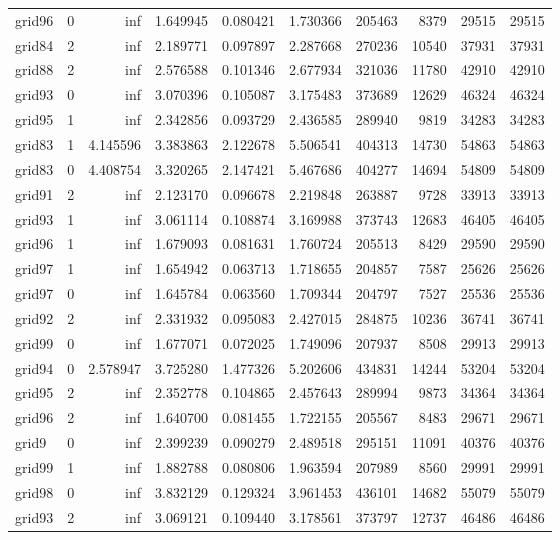 \begin{longtable}{|l|r|r|r|r|r|r|r|r|r|}
grid96 & 0 & inf & 1.649945 & 0.080421 & 1.730366 & 205463 & 8379 & 29515 & 29515 \\
grid84 & 2 & inf & 2.189771 & 0.097897 & 2.287668 & 270236 & 10540 & 37931 & 37931 \\
grid88 & 2 & inf & 2.576588 & 0.101346 & 2.677934 & 321036 & 11780 & 42910 & 42910 \\
grid93 & 0 & inf & 3.070396 & 0.105087 & 3.175483 & 373689 & 12629 & 46324 & 46324 \\
grid95 & 1 & inf & 2.342856 & 0.093729 & 2.436585 & 289940 & 9819 & 34283 & 34283 \\
grid83 & 1 & 4.145596 & 3.383863 & 2.122678 & 5.506541 & 404313 & 14730 & 54863 & 54863 \\
grid83 & 0 & 4.408754 & 3.320265 & 2.147421 & 5.467686 & 404277 & 14694 & 54809 & 54809 \\
grid91 & 2 & inf & 2.123170 & 0.096678 & 2.219848 & 263887 & 9728 & 33913 & 33913 \\
grid93 & 1 & inf & 3.061114 & 0.108874 & 3.169988 & 373743 & 12683 & 46405 & 46405 \\
grid96 & 1 & inf & 1.679093 & 0.081631 & 1.760724 & 205513 & 8429 & 29590 & 29590 \\
grid97 & 1 & inf & 1.654942 & 0.063713 & 1.718655 & 204857 & 7587 & 25626 & 25626 \\
grid97 & 0 & inf & 1.645784 & 0.063560 & 1.709344 & 204797 & 7527 & 25536 & 25536 \\
grid92 & 2 & inf & 2.331932 & 0.095083 & 2.427015 & 284875 & 10236 & 36741 & 36741 \\
grid99 & 0 & inf & 1.677071 & 0.072025 & 1.749096 & 207937 & 8508 & 29913 & 29913 \\
grid94 & 0 & 2.578947 & 3.725280 & 1.477326 & 5.202606 & 434831 & 14244 & 53204 & 53204 \\
grid95 & 2 & inf & 2.352778 & 0.104865 & 2.457643 & 289994 & 9873 & 34364 & 34364 \\
grid96 & 2 & inf & 1.640700 & 0.081455 & 1.722155 & 205567 & 8483 & 29671 & 29671 \\
grid9 & 0 & inf & 2.399239 & 0.090279 & 2.489518 & 295151 & 11091 & 40376 & 40376 \\
grid99 & 1 & inf & 1.882788 & 0.080806 & 1.963594 & 207989 & 8560 & 29991 & 29991 \\
grid98 & 0 & inf & 3.832129 & 0.129324 & 3.961453 & 436101 & 14682 & 55079 & 55079 \\
grid93 & 2 & inf & 3.069121 & 0.109440 & 3.178561 & 373797 & 12737 & 46486 & 46486 \\

\end{longtable}
